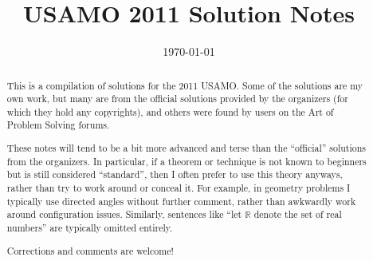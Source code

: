 \documentclass[11pt]{scrartcl}
\title{USAMO 2011 Solution Notes}
\date{\today}
\begin{document}
\maketitle

\begin{abstract}
This is a compilation of solutions
for the 2011 USAMO.
Some of the solutions are my own work,
but many are from the official solutions provided by the organizers
(for which they hold any copyrights),
and others were found by users on the Art of Problem Solving forums.

These notes will tend to be a bit more advanced and terse than the ``official''
solutions from the organizers.
In particular, if a theorem or technique is not known to beginners
but is still considered ``standard'', then I often prefer to
use this theory anyways, rather than try to work around or conceal it.
For example, in geometry problems I typically use directed angles
without further comment, rather than awkwardly work around configuration issues.
Similarly, sentences like ``let $\mathbb{R}$ denote the set of real numbers''
are typically omitted entirely.

Corrections and comments are welcome!
\end{abstract}

\tableofcontents
\newpage

\addtocounter{section}{-1}
\end{document}
